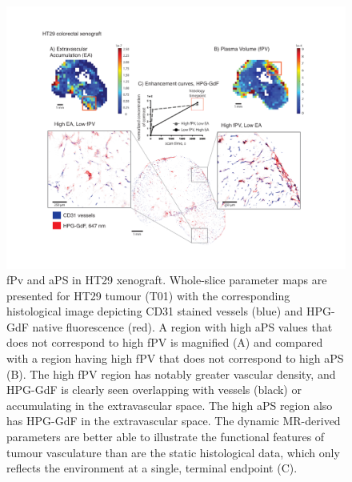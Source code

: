 \begin{figure}[htbp]
 \begin{center}
 \includegraphics[width=\textwidth]{hpg/hpg-paper1-images/hpg_fig5-ht29fpv.pdf}
 \caption{fPv and \ac{aPS} in HT29 xenograft.
 Whole-slice parameter maps are presented for HT29 tumour (T01) with the corresponding histological image depicting CD31 stained vessels (blue) and \ac{HPG-GdF} native fluorescence (red).
 A region with high \ac{aPS} values that does not correspond to high \ac{fPV} is magnified (A) and compared with a region having high \ac{fPV} that does not correspond to high \ac{aPS} (B).
 The high \ac{fPV} region has notably greater vascular density, and \ac{HPG-GdF} is clearly seen overlapping with vessels (black) or accumulating in the extravascular space.
 The high \ac{aPS} region also has \ac{HPG-GdF} in the extravascular space.
 The dynamic MR-derived parameters are better able to illustrate the functional features of tumour vasculature than are the static histological data, which only reflects the environment at a single, terminal endpoint (C).}
 \label{hpgpaper1:fig5}
 \end{center}
\end{figure}

